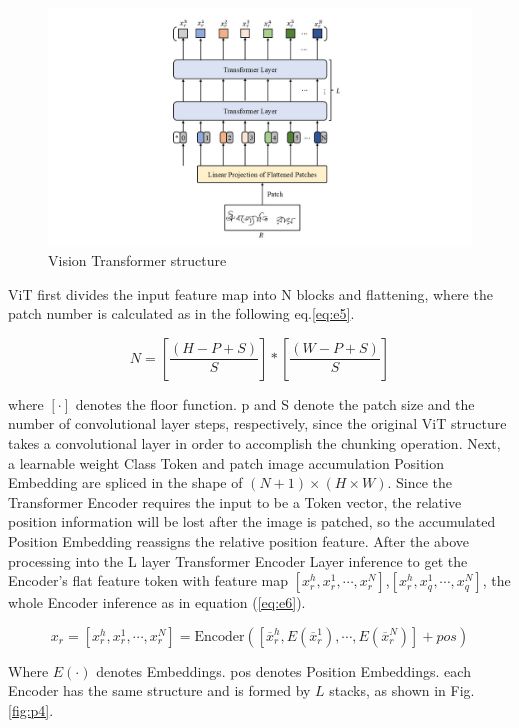 \documentclass{article}
\begin{document}
\begin{figure}[htbp]
	\centering
	\includegraphics[scale=0.45]{figure/p3.jpg}
	\caption{Vision Transformer structure}\label{fig:p3}
\end{figure}

ViT first divides the input feature map into N blocks and flattening, where the patch number is calculated as in the following eq.\ref{eq:e5}.

\begin{equation}\label{eq:e5}
	N = [\frac{(H-P+S)}{S}]*[\frac{(W-P+S)}{S}]
\end{equation}

where $[\cdot]$ denotes the floor function. p and S denote the patch size and the number of convolutional layer steps, respectively, since the original ViT structure takes a convolutional layer in order to accomplish the chunking operation. Next, a learnable weight Class Token and patch image accumulation Position Embedding are spliced in the shape of $(N+1)\times(H\times W)$. Since the Transformer Encoder requires the input to be a Token vector, the relative position information will be lost after the image is patched, so the accumulated Position Embedding reassigns the relative position feature. After the above processing into the L layer Transformer Encoder Layer inference to get the Encoder's flat feature token with feature map $[x_r^h,x_r^1,\cdots,x_r^N ]$,$[x_r^h,x_q^1 ,\cdots,x_q^N]$, the whole Encoder inference as in equation (\ref{eq:e6}).

\begin{equation}\label{eq:e6}
	x_r=[x_r^h,x_r^1,\cdots,x_r^N ]=\mbox{Encoder}([\overline{x}_r^h,E(\overline{x}_r^1),\cdots,E(\overline{x}_r^N )]+pos)
\end{equation}

Where $E(\cdot)$ denotes Embeddings. pos denotes Position Embeddings. each Encoder has the same structure and is formed by $L$ stacks, as shown in Fig. \ref{fig:p4}.
\end{document}

